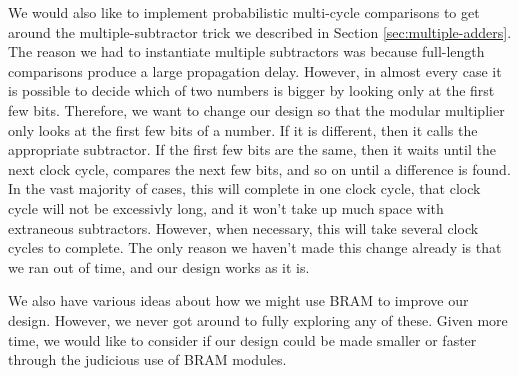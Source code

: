 \documentclass[a4paper,11pt]{report}
\begin{document}
We would also like to implement probabilistic multi-cycle comparisons to get around the multiple-subtractor trick we described in Section \ref{sec:multiple-adders}.
The reason we had to instantiate multiple subtractors was because full-length comparisons produce a large propagation delay.
However, in almost every case it is possible to decide which of two numbers is bigger by looking only at the first few bits.
Therefore, we want to change our design so that the modular multiplier only looks at the first few bits of a number.
If it is different, then it calls the appropriate subtractor.
If the first few bits are the same, then it waits until the next clock cycle, compares the next few bits, and so on until a difference is found.
In the vast majority of cases, this will complete in one clock cycle, that clock cycle will not be excessivly long,
and it won't take up much space with extraneous subtractors.
However, when necessary, this will take several clock cycles to complete.
The only reason we haven't made this change already is that we ran out of time, and our design works as it is.

We also have various ideas about how we might use BRAM to improve our design.
However, we never got around to fully exploring any of these.
Given more time, we would like to consider if our design could be made smaller or faster through the judicious use of BRAM modules.
\end{document}
